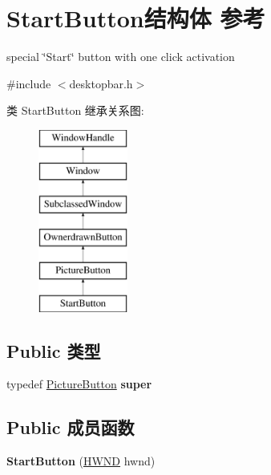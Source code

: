 \hypertarget{struct_start_button}{}\section{Start\+Button结构体 参考}
\label{struct_start_button}


special \char`\"{}\+Start\char`\"{} button with one click activation  




{\ttfamily \#include $<$desktopbar.\+h$>$}

类 Start\+Button 继承关系图\+:\begin{figure}[H]
\begin{center}
\leavevmode
\includegraphics[height=6.000000cm]{struct_start_button}
\end{center}
\end{figure}
\subsection*{Public 类型}
\begin{DoxyCompactItemize}
\item 
\mbox{\label{struct_start_button_a0abc3c95935ba6c959b30a8ffbdb4935}} 
typedef \hyperlink{struct_picture_button}{Picture\+Button} {\bfseries super}
\end{DoxyCompactItemize}
\subsection*{Public 成员函数}
\begin{DoxyCompactItemize}
\item 
\mbox{\label{struct_start_button_a2c5e8c09207b281dc4df417c888fa05b}} 
{\bfseries Start\+Button} (\hyperlink{interfacevoid}{H\+W\+ND} hwnd)
\end{DoxyCompactItemize}
